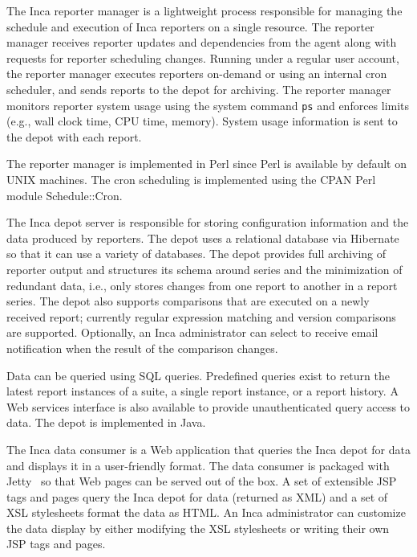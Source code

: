 \documentclass[times,10pt,twocolumn]{article}
\begin{document}

\label{rm}

The Inca reporter manager is a lightweight process responsible for managing
the schedule and execution of Inca reporters on a single resource. The
reporter manager receives reporter updates and dependencies from the agent
along with requests for reporter scheduling changes.  Running under a regular
user account, the reporter manager executes reporters on-demand or using an
internal cron scheduler, and sends reports to the depot for archiving. The
reporter manager monitors reporter system usage using the system command
\texttt{ps} and enforces limits (e.g., wall clock time, CPU time, memory).
System usage information is sent to the depot with each report. 

The reporter manager is implemented in Perl since Perl is available by default
on UNIX machines.  The cron scheduling is implemented using the CPAN Perl
module Schedule::Cron.  


The Inca depot server is responsible for storing configuration information and
the data produced by reporters. The depot uses a relational database via
Hibernate~\cite{hibernate} so that it can use a variety of databases.  The
depot provides full archiving of reporter output and structures its schema
around series and the minimization of redundant data, i.e., only stores
changes from one report to another in a report series.  The depot also
supports comparisons that are executed on a newly received report; 
currently regular expression matching and version comparisons are 
supported.  Optionally, an Inca administrator can select to receive
email notification when the result of the comparison changes.

Data can be queried using SQL queries. Predefined queries exist to return the
latest report instances of a suite, a single report instance, or a report
history.  A Web services interface is also available to provide
unauthenticated query access to data.  The depot is implemented in Java.


The Inca data consumer is a Web application that queries the Inca depot for
data and displays it in a user-friendly format.  The data consumer is packaged
with Jetty~\cite{jetty} so that Web pages can be served out of the box.  A set
of extensible JSP tags and pages query the Inca depot for data (returned as
XML)
and a set of XSL stylesheets format the data as HTML.  An Inca administrator
can customize the data display by either modifying the XSL stylesheets or
writing their own JSP tags and pages.
\end{document}
